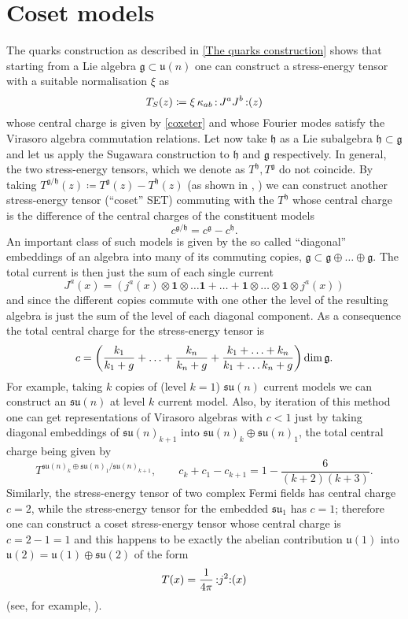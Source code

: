  \section{Coset models}
 \label{Coset models}
 The quarks construction as described in 
 \ref{The quarks construction}
 shows that starting from a Lie algebra $\mathfrak{g}
 \subset\mathfrak{u}(n)$
 one can construct a stress-energy tensor with a 
 suitable normalisation $\xi$ as 
 \[
 T_S(z)\coloneqq \xi\,\kappa_{ab}\,\wick{\,J^a J^b\,}(z)
 \]
 whose central charge is given by \eqref{coxeter} and whose
 Fourier modes satisfy the Virasoro algebra commutation
 relations. Let now take $\mathfrak{h}$ as a Lie subalgebra
 $\mathfrak{h}\subset\mathfrak{g}$ and let us apply the
 Sugawara construction to $\mathfrak{h}$ and $\mathfrak{g}$
 respectively. In general, the two stress-energy tensors,
 which we denote as $T^{\mathfrak{h}}, T^{\mathfrak{g}}$ 
 do not coincide. By taking $T^{\mathfrak{g}/\mathfrak{h}}(z)
 \coloneqq T^{\mathfrak{g}}(z)-T^{\mathfrak{h}}(z)$ (as shown in 
 \cite{GKO:1986},  \cite{GKO:1985}) we can construct
 another stress-energy tensor (``coset'' SET) 
 commuting with the $T^{\mathfrak{h}}$ 
 whose central charge is the difference of the
 central charges of the constituent models
 \[
 c^{\mathfrak{g}/\mathfrak{h}}=
 c^{\mathfrak{g}}-c^{\mathfrak{h}}.
 \]
 An important class of such models is given by the
 so called ``diagonal'' embeddings of an algebra into
 many of its commuting copies, $\mathfrak{g}
 \subset \mathfrak{g} \oplus\ldots\oplus\mathfrak{g}$. The total 
 current is then just the sum of each single current
 \[
 J^a(x)=\left(j^a(x)\otimes\bm{1}\otimes\ldots\bm{1}+
 \ldots+\bm{1}\otimes\ldots\otimes\bm{1}\otimes j^a(x)
 \right)
 \]
 and since the different copies commute with one other
 the level of the resulting algebra is just the sum
 of the level of each diagonal component. As a consequence
 the total central charge for the stress-energy tensor is
 \[
 c=\left(\frac{k_1}{k_1+g}+\ldots+\frac{k_n}{k_n+g}+
 \frac{k_1+\ldots+ k_n}{k_1+\ldots k_n+g}\right)
 \operatorname{dim} \mathfrak{g}.
 \]
 For example, taking $k$ copies of (level $k=1$) 
 $\mathfrak{su}(n)$ current models we can construct
 an $\mathfrak{su}(n)$ at level $k$ current model.
 Also, by iteration of this method one can get 
 representations of Virasoro algebras with $c<1$ just
 by taking diagonal embeddings of 
 ${\mathfrak{su}(n)}_{k+1}$ into ${\mathfrak{su}(n)}_k
 \oplus {\mathfrak{su}(n)}_1$, the total central
 charge being given by
 \[
 T^{{\mathfrak{su}(n)}_k\oplus {\mathfrak{su}(n)}_1/
 {\mathfrak{su}(n)}_{k+1}},\qquad
 c_k+c_1-c_{k+1}=1-\frac{6}{(k+2)(k+3)}.
 \]
 Similarly, the stress-energy tensor of two complex
 Fermi fields has central charge $c=2$, while the 
 stress-energy tensor for the embedded $\mathfrak{su}_1$
 has $c=1$; therefore one can construct a coset stress-energy 
 tensor whose central charge is $c=2-1=1$ and
 this happens to be exactly the abelian contribution
 $\mathfrak{u}(1)$ into $\mathfrak{u}(2)=\mathfrak{u}(1)
 \oplus \mathfrak{su}(2)$ of the form
 \[
 T(x)=\frac{1}{4\pi}\,\wick{j^2}(x)
 \]
 (see, for example, \cite{Fuchs:1992}).
 
